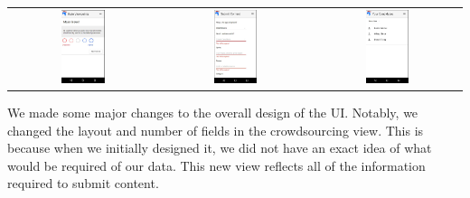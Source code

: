 \documentclass[11pt]{article}
\begin{document}
\begin{tabular}{ccc}
    \includegraphics[width = 0.31\textwidth]{1.jpg}
    &
    \includegraphics[width = 0.31\textwidth]{2.jpg}
    &
    \includegraphics[width = 0.31\textwidth]{3.jpg}
\end{tabular}

We made some major changes to the overall design of the UI. Notably, we changed the layout and number of fields in the crowdsourcing view. This is because when we initially designed it, we did not have an exact idea of what would be required of our data. This new view reflects all of the information required to submit content.
\end{document}
